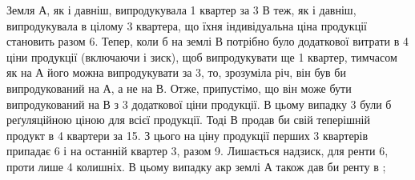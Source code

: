 Земля $А$, як і давніш, випродукувала 1 квартер за 3 $В$ теж,
як і давніш, випродукувала в цілому 3 квартера, що їхня індивідуальна ціна
продукції становить разом 6. Тепер, коли б на землі $В$ потрібно було
додаткової витрати в 4 ціни продукції (включаючи і зиск), щоб випродукувати ще 1 квартер,
тимчасом як на $А$ його можна випродукувати за
3, то, зрозуміла річ, він був би випродукований на $А$, а не на $В$.
Отже, припустімо, що він може бути випродукований на $В$ з 3
додаткової ціни продукції. В цьому випадку 3 були б реґуляційною ціною
для всієї продукції. Тоді $В$ продав би свій теперішній продукт в 4  квартери за
15. З цього на ціну продукції перших 3  квартерів припадає
6 і на останній квартер 3, разом 9. Лишається
надзиск, для ренти \deq{} 6, проти лише 4 колишніх.
В цьому випадку акр землі $А$ також дав би ренту в  ;
\parbreak{}  %
